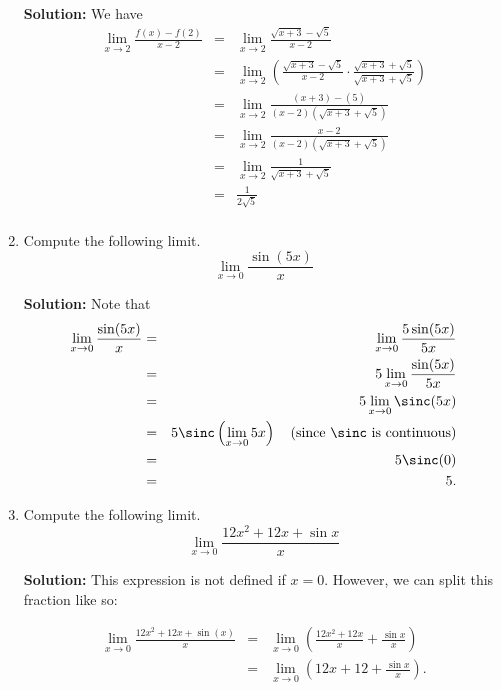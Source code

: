 \documentclass{article}
\begin{document}
\begin{enumerate}
\textbf{Solution:} We have
\begin{eqnarray*}
\lim_{x \rightarrow 2} \frac{f(x) - f(2)}{x - 2} & = & \lim_{x \rightarrow 2} \frac{\sqrt{x + 3} - \sqrt{5}}{x - 2} \\
 & = & \lim_{x \rightarrow 2} \left( \frac{\sqrt{x + 3} - \sqrt{5}}{x - 2} \cdot \frac{\sqrt{x + 3} + \sqrt{5}}{\sqrt{x + 3} + \sqrt{5}} \right) \\
 & = & \lim_{x \rightarrow 2} \frac{(x + 3) - (5)}{(x - 2)\left( \sqrt{x + 3} + \sqrt{5} \right)} \\
 & = & \lim_{x \rightarrow 2} \frac{x - 2}{(x - 2)\left( \sqrt{x + 3} + \sqrt{5} \right)} \\
 & = & \lim_{x \rightarrow 2} \frac{1}{\sqrt{x + 3} + \sqrt{5}} \\
 & = & \frac{1}{2\sqrt{5}} \\
\end{eqnarray*}


  
\vspace{1cm}

\item Compute the following limit. \[ \lim_{x \rightarrow 0} \frac{\sin(5 x)}{x} \]

\textbf{Solution:} Note that
\begin{eqnarray*}
\lim_{x \rightarrow 0} \frac{\sin(5 x)}{x}
 & = & \lim_{x \rightarrow 0} \frac{5\sin(5 x)}{5 x} \\
 & = & 5 \lim_{x \rightarrow 0} \frac{\sin(5 x)}{5 x} \\
 & = & 5 \lim_{x \rightarrow 0} \sinc(5 x) \\
 & = & 5 \sinc\left( \lim_{x \rightarrow 0} 5 x \right) \quad \mathrm{(since}\ \sinc\ \mathrm{is\ continuous)} \\
 & = & 5 \sinc(0) \\
 & = & 5.
\end{eqnarray*}


  
\vspace{1cm}

\item Compute the following limit. \[ \lim_{x \rightarrow 0} \frac{12 x^2 + 12 x + \sin x}{x} \]

\textbf{Solution:} This expression is not defined if $x = 0$. However, we can split this fraction like so:

\begin{eqnarray*}
\lim_{x \rightarrow 0} \frac{12 x^2 + 12 x + \sin(x)}{x}
 & = & \lim_{x \rightarrow 0} \left( \frac{12 x^2 + 12 x}{x} + \frac{\sin x}{x} \right) \\
 & = & \lim_{x \rightarrow 0} \left( 12 x + 12 + \frac{\sin x}{x} \right). \\
\end{eqnarray*}


\end{enumerate}
\end{document}

